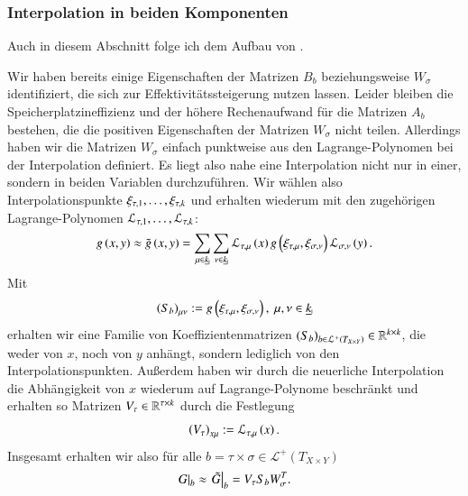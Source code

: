     \subsubsection{Interpolation in beiden Komponenten}
    Auch in diesem Abschnitt folge ich dem Aufbau von \citet{nichtlokop}.
    
    Wir haben bereits einige Eigenschaften der Matrizen $B_b$ beziehungsweise $W_\sigma$ identifiziert, die sich zur Effektivitätssteigerung nutzen lassen.
    Leider bleiben die Speicherplatzineffizienz und der höhere Rechenaufwand für die Matrizen $A_b$ bestehen, die die positiven Eigenschaften der Matrizen $W_\sigma$ nicht teilen. Allerdings 
    haben wir die Matrizen $W_\sigma$ einfach punktweise aus den Lagrange-Polynomen bei der Interpolation definiert. Es liegt also nahe eine Interpolation nicht nur in einer, sondern in beiden 
    Variablen durchzuführen. Wir wählen also Interpolationspunkte $\xi_{\tau, 1}, \dots , \xi_{\tau, k}$ und erhalten wiederum mit den zugehörigen Lagrange-Polynomen 
    $\mathcal{L}_{\tau, 1}, \dots, \mathcal{L}_{\tau, k}$:
    \begin{equation*}
      g\left(x,y\right) \approx \tilde g\left(x,y\right) = \sum_{\mu \in \haken{k}} \sum_{\nu \in \haken{k}} \lag_\indt{\mu}\left(x\right) g\left(\xi_\indt{\mu}, \xi_\inds{\nu}\right) \lag_\inds{\nu}\left(y\right).
    \end{equation*}
    Mit 
    \begin{equation*}
      \left(S_b\right)_{\mu\nu} := g\left(\xi_\indt{\mu}, \xi_\inds{\nu}\right), \ \mu,\nu \in \haken{k}
    \end{equation*}
    erhalten wir eine Familie von Koeffizientenmatrizen $\left(S_b\right)_{b \in \mathcal{L}^+\left(T_{X \times Y}\right)} \in \mathbb{R}^{k \times k}$, die weder von $x$, noch von $y$ anhängt, sondern lediglich von den 
    Interpolationspunkten.
    Außerdem haben wir durch die neuerliche Interpolation die Abhängigkeit von $x$ wiederum auf Lagrange-Polynome beschränkt und erhalten so Matrizen $V_\tau \in \mathbb{R}^{\tau \times k}$ durch
    die Festlegung
    \begin{equation*}
      \left(V_\tau\right)_{x\mu} := \mathcal{L}_{\tau, \mu}\left(x\right).
    \end{equation*}
    Insgesamt erhalten wir also für alle $b = \tau \times \sigma \in \mathcal{L}^+\left(T_{X \times Y}\right)$
    \begin{equation*}
      \left. G \right|_b \approx \left. \tilde G \right|_b = V_\tau S_b W_\sigma^T.
    \end{equation*}
    
